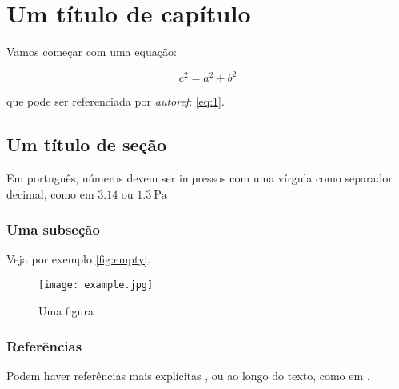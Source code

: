 \documentclass[a4,brazil]{brthesis}
\begin{document}
\printtoc

\textual

\chapter{Um título de capítulo}
\label{cha:chapter-title}

Vamos começar com uma equação:

\begin{equation}
  \label{eq:1}
  c^2 = a^2 + b^2
\end{equation}

\noindent que pode ser referenciada por \textsl{autoref}: \autoref{eq:1}.

\section{Um título de seção}
\label{sec:section-title}

Em português, números devem ser impressos com uma vírgula como separador decimal, como em $\num{3.14}$ ou $\SI{1.3}{\pascal}$

\subsection{Uma subseção}
\label{sec:subsection}

Veja por exemplo \autoref{fig:empty}.

\begin{figure}[!ht]
  \centering
  \texttt{[image: example.jpg]}
  \caption{Uma figura}
  \label{fig:empty}
\end{figure}


\subsection{Referências}
\label{sec:referencias}

Podem haver referências mais explícitas \cite{bib:furlani}, ou ao longo do texto, como em .

\postextual


\end{document}
